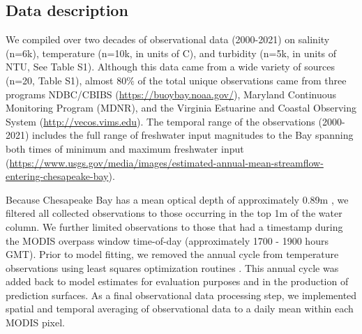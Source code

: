 \documentclass{article}
\begin{document}
\subsection{Data description}

\begin{sloppypar}
We compiled over two decades of observational data (2000-2021) on salinity (n=6k), temperature (n=10k, in units of \degree C), and turbidity (n=5k, in units of NTU, See Table S1). Although this data came from a wide variety of sources (n=20, Table S1), almost $80\%$ of the total unique observations came from three programs NDBC/CBIBS (\url{https://buoybay.noaa.gov/}), Maryland Continuous Monitoring Program (MDNR), and the Virginia Estuarine and Coastal Observing System (\url{http://vecos.vims.edu}). The temporal range of the observations (2000-2021) includes the full range of freshwater input magnitudes to the Bay spanning both times of minimum and maximum freshwater input (\url{https://www.usgs.gov/media/images/estimated-annual-mean-streamflow-entering-chesapeake-bay}).
\end{sloppypar}

Because Chesapeake Bay has a mean optical depth of approximately 0.89m \cite{urquhartRemotelySensedEstimates2012}, we filtered all collected observations to those occurring in the top 1m of the water column. We further limited observations to those that had a timestamp during the MODIS overpass window time-of-day (approximately 1700 - 1900 hours GMT). Prior to model fitting, we removed the annual cycle from temperature observations using least squares optimization routines \cite{virtanenSciPyFundamentalAlgorithms2020a}. This annual cycle was added back to model estimates for evaluation purposes and in the production of prediction surfaces. As a final observational data processing step, we implemented spatial and temporal averaging of observational data to a daily mean within each MODIS pixel. 
\end{document}
